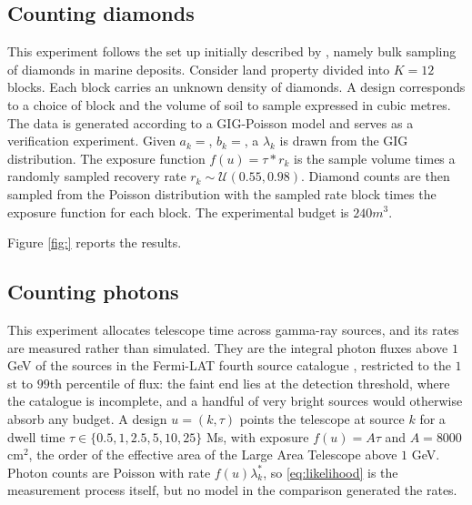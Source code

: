 \documentclass[twoside]{article}
\theoremstyle{plain}
\theoremstyle{definition}
\theoremstyle{remark}
\begin{document}
\subsection{Counting diamonds} \label{eq:exp_diamonds}
This experiment follows the set up initially described by \citet{sichel1973statistical}, namely bulk sampling of diamonds in marine deposits. Consider land property divided into $K =12 $ blocks. Each block carries an unknown density of diamonds. A design corresponds to a choice of block and the volume of soil to sample expressed in cubic metres. The data is generated according to a GIG-Poisson model and serves as a verification experiment. Given $a_k = $, $b_k = $, a $\lambda_k$ is drawn from the GIG distribution. The exposure function $f(u) = \tau*r_k$ is the sample volume times a randomly sampled recovery rate $r_k \sim \mathcal{U}(0.55, 0.98)$. Diamond counts are then sampled from the Poisson distribution with the sampled rate block times the exposure function for each block. The experimental budget is $240 m^3$. 

Figure \ref{fig:} reports the results. 

\subsection{Counting photons} \label{sec:exp_photons}
This experiment allocates telescope time across gamma-ray sources, and its rates are measured rather than simulated.
They are the integral photon fluxes above $1$ GeV of the sources in the Fermi-LAT fourth source catalogue \citep{abdollahi2020fermi}, restricted to the $1$st to $99$th percentile of flux: the faint end lies at the detection threshold, where the catalogue is incomplete, and a handful of very bright sources would otherwise absorb any budget.
A design $u = (k, \tau)$ points the telescope at source $k$ for a dwell time $\tau \in \{0.5, 1, 2.5, 5, 10, 25\}$ Ms, with exposure $f(u) = A \tau$ and $A = 8000$ cm$^2$, the order of the effective area of the Large Area Telescope above $1$ GeV.
Photon counts are Poisson with rate $f(u) \lambda^{*}_k$, so \eqref{eq:likelihood} is the measurement process itself, but no model in the comparison generated the rates.
\end{document}
